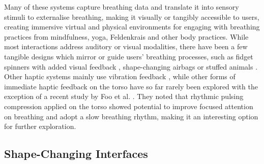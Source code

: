 Many of these systems capture breathing data and translate it into sensory stimuli to externalise breathing, making it visually or tangibly accessible to users, creating immersive virtual and physical environments for engaging with breathing practices from mindfulness, yoga, Feldenkrais \cite{moran_exopranayama_2016, patibanda_life_2017, vidyarthi_sonic_2012, stahl_soma_2016, shamekhi_breathe_2018} and other body practices. While most interactions address auditory or visual modalities, there have been a few tangible designs which mirror or guide users' breathing processes, such as fidget spinners with added visual feedback \cite{liang_biofidget_2018}, shape-changing airbags \cite{yu_breathe_2015} or stuffed animals \cite{aslan_hold_2016}. Other haptic systems mainly use vibration feedback \cite{dijk_breathe_2011,bumatay_investigating_2017, miri_piv_2020}, while other forms of immediate haptic feedback on the torso have so far rarely been explored with the exception of a recent study by Foo et al. \cite{foo_soft_2020}. They noted that rhythmic pulsing compression applied on the torso showed potential to improve focused attention on breathing and adopt a slow breathing rhythm, making it an interesting option for further exploration.

\subsection*{Shape-Changing Interfaces}

